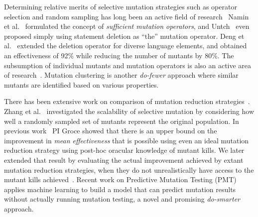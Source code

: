 Determining relative merits of selective mutation strategies such as operator
selection and random sampling has long been an active field of research~\cite{wong1995reducing,mresa1999efficiency,zhang2010isoperator} 
Namin et al.~\cite{namin2006finding,namin2008sufficient} formulated the
concept of \emph{sufficient mutation operators}, and
Untch~\cite{untch2009onreduced} even proposed simply using statement
deletion as ``the'' mutation operator.  Deng et al.~\cite{deng2013empirical} extended the deletion operator for diverse
language elements, and obtained an effectiveness of 92\% while reducing the
number of mutants by 80\%.
The subsumption of individual mutants and mutation operators is also an active
area of research~\cite{gopinath2016measuring,shin2016theoretical,lindstrom2015redundant}.
Mutation clustering\cite{derezinska2015toward,strug2012machine,hussain2008mutation} is another \emph{do-fewer}
approach where similar mutants are identified based on various
properties.

There has been extensive work on comparison of mutation
reduction strategies~\cite{zhang2010isoperator,zhang2013operator}.
Zhang et al.~\cite{zhang2014an} investigated the scalability of
selective mutation by considering how well a randomly sampled set of mutants
represent the original population. 
In previous work~\cite{gopinath2016on} PI Groce showed that there is
an upper bound on the improvement
in \emph{mean effectiveness} that is possible using even
an ideal mutation reduction strategy using post-hoc oracular knowledge of mutant
kills. We later extended that result by evaluating the actual improvement
achieved by extant mutation reduction strategies, when they do not
unrealistically have access to the
mutant kills achieved~\cite{gopinath2017mutation}.  Recent work on Predictive 
Mutation Testing (PMT)~\cite{zhang2016predictive} applies machine 
learning to build a model that can predict mutation results without 
actually running mutation testing, a novel and promising
\emph{do-smarter} approach.



